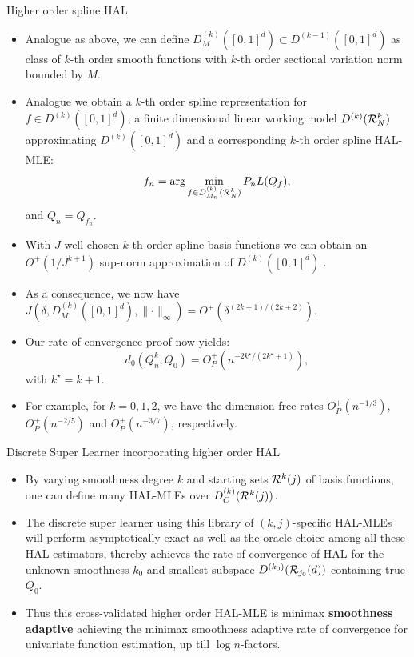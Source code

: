 \documentclass[t]{beamer}
\begin{document}
\begin{frame}{Higher order spline HAL}
\begin{itemize}
\item Analogue as above, we can define $D^{(k)}_M([0,1]^d)\subset
  D^{(k-1)}([0,1]^d)$ as class of $k$-th order smooth functions with $k$-th
  order sectional variation norm bounded by $M$.
\item Analogue we obtain a $k$-th order spline representation for $f\in
  D^{(k)}([0,1]^d)$; a finite dimensional linear working model $D^{(k)}({\cal
  R}^k_N)$ approximating $D^{(k)}([0,1]^d)$ and a corresponding $k$-th order
  spline HAL-MLE:
\[
f_n=\arg\min_{f\in D^{(k)}_{M_n}({\cal R}^k_N)}P_n L(Q_f),\]
and $Q_n=Q_{f_n}$.
\item With $J$ well chosen $k$-th order spline basis functions we can obtain an $O^+(1/J^{k+1})$ sup-norm approximation of $D^{(k)}([0,1]^d)$ .
\end{itemize}
\end{frame}
\begin{frame}
\begin{itemize}
\item As a consequence, we now have
$J(\delta,D^{(k)}_M([0,1]^d),\lVert\cdot\rVert_{\infty})=O^+(\delta^{(2k+1)/(2k+2)})$.
\item Our rate of convergence proof now yields:
\[
d_0(Q_n^k,Q_0)=O^+_P(n^{-2k^{\star}/(2k^{\star}+1)}),\]
with $k^{\star}=k+1$.
\item For example, for $k=0,1,2$, we have the dimension free rates $O_P^+(n^{-1/3})$, $O_P^+(n^{-2/5})$ and $O_P^+(n^{-3/7})$, respectively.
\end{itemize}
\end{frame}
\begin{frame}{Discrete Super Learner incorporating  higher order HAL}
\begin{itemize}
    \item By varying smoothness degree $k$ and starting sets ${\cal R}^k(j)$ of basis functions, one can define many HAL-MLEs over  $D^{(k)}_C({\cal R}^k(j))$.
    \item The discrete super learner using this library of $(k,j)$-specific HAL-MLEs will perform asymptotically exact as well as the oracle choice among all these HAL estimators,  thereby achieves the rate of convergence of HAL for the unknown smoothness $k_0$  and smallest subspace $D^{(k_0)}({\cal R}_{j_0}(d))$ containing true $Q_0$.
    \item Thus this cross-validated higher order HAL-MLE is minimax {\bf smoothness adaptive} achieving the minimax smoothness adaptive rate of convergence for univariate function estimation, up till $\log n$-factors.
\end{itemize}
\end{frame}
\end{document}
